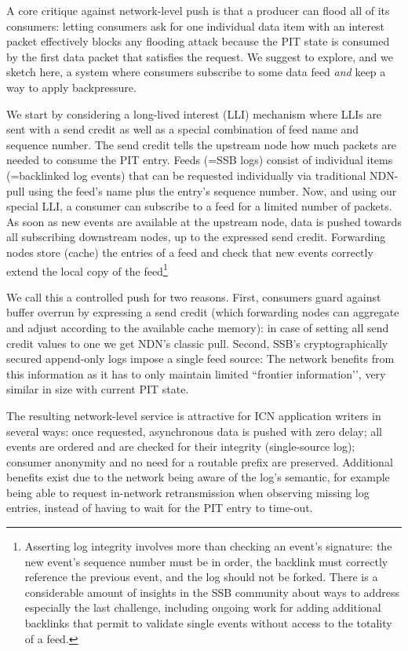\documentclass[9pt,sigconf]{acmart}
\begin{document}
A core critique against network-level push is that a producer can
flood all of its consumers: letting consumers ask for one individual
data item with an interest packet effectively blocks any flooding
attack because the PIT state is consumed by the first data packet that
satisfies the request. We suggest to explore, and we sketch here, a
system where consumers subscribe to some data feed {\em and} keep a
way to apply backpressure.

We start by considering a long-lived interest (LLI) mechanism where
LLIs are sent with a send credit as well as a special combination of
feed name and sequence number. The send credit tells the upstream node
how much packets are needed to consume the PIT entry. Feeds (=SSB
logs) consist of individual items (=backlinked log events) that can be
requested individually via traditional NDN-pull using the feed’s name
plus the entry’s sequence number. Now, and using our special LLI, a
consumer can subscribe to a feed for a limited number of packets. As
soon as new events are available at the upstream node, data is pushed
towards all subscribing downstream nodes, up to the expressed send
credit. Forwarding nodes store (cache) the entries of a feed and check
that new events correctly extend the local copy of the feed\footnote{
  Asserting log integrity involves more than checking an event's
  signature: the new event's sequence number must be in order, the
  backlink must correctly reference the previous event, and the log
  should not be forked. There is a considerable amount of insights in
  the SSB community about ways to address especially the last
  challenge, including ongoing work for adding additional backlinks
  that permit to validate single events without access to the totality
  of a feed.}

We call this a controlled push for two reasons. First, consumers
guard against buffer overrun by expressing a send credit (which
forwarding nodes can aggregate and adjust according to the available
cache memory): in case of setting all send credit values to one we get
NDN’s classic pull. Second, SSB’s cryptographically secured
append-only logs impose a single feed source: The network benefits
from this information as it has to only maintain limited ``frontier
information’’, very similar in size with current PIT state.

The resulting network-level service is attractive for ICN application
writers in several ways: once requested, asynchronous data is pushed
with zero delay; all events are ordered and are checked for their
integrity (single-source log); consumer anonymity and no need for a
routable prefix are preserved. Additional benefits exist due to the
network being aware of the log’s semantic, for example being able to
request in-network retransmission when observing missing log entries,
instead of having to wait for the PIT entry to time-out.
\end{document}
